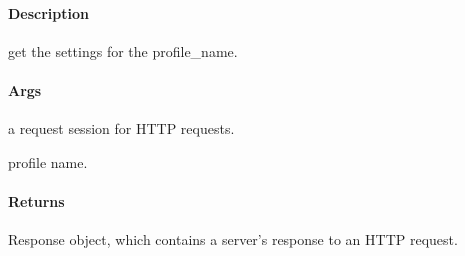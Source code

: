 \documentclass[letterpaper,10pt,english]{sphinxmanual}
\begin{document}
\begin{fulllineitems}
\label{\detokenize{gemini_perception_API:gemini_perception_API.get_perception_profile_by_name}}
\pysigstartsignatures
{}
\pysigstopsignatures

\paragraph{Description}
\label{\detokenize{gemini_perception_API:id11}}
\sphinxAtStartPar
get the settings for the profile\_name.


\paragraph{Args}
\label{\detokenize{gemini_perception_API:id12}}\begin{description}
\sphinxAtStartPar
a request session for HTTP requests.

\sphinxAtStartPar
profile name.

\end{description}


\paragraph{Returns}
\label{\detokenize{gemini_perception_API:id13}}\begin{description}
\sphinxAtStartPar
Response object, which contains a server’s response to an HTTP request.

\end{description}

\end{fulllineitems}


\begin{fulllineitems}
\label{\detokenize{gemini_perception_API:gemini_perception_API.get_perception_profile_defaults}}
\pysigstartsignatures
{}
\pysigstopsignatures
\end{fulllineitems}
\end{document}
